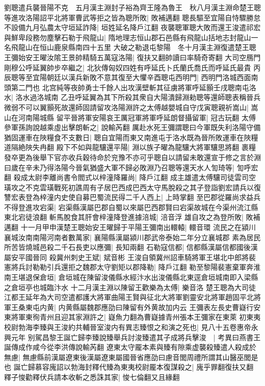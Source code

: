 劉聰遣兵襲晉陽不克　五月漢主淵封子裕為齊王隆為魯王　秋八月漢主淵命楚王聰等進攻洛陽詔平北將軍曹武等拒之皆為聰所敗|{
	敗補邁翻}
聰長驅至宜陽自恃驟勝怠不設備九月弘農太守垣延詐降|{
	垣姓延名降戶江翻}
夜襲聰軍聰大敗而還王浚遣祁宏與鮮卑段務勿塵擊石勒于飛龍山|{
	隋地理志恒山郡石邑縣有飛龍山括地志封龍山一名飛龍山在恒山鹿泉縣南四十五里}
大破之勒退屯黎陽　冬十月漢主淵復遣楚王聰王彌始安王曜汝隂王景帥精騎五萬寇洛陽|{
	復扶又翻帥讀曰率騎奇寄翻}
大司空鴈門剛穆公呼延翼帥步卒繼之|{
	北狄傳匈奴四姓有呼延氏卜氏蘭氏喬氏而呼延氏最貴}
丙辰聰等至宜陽朝廷以漢兵新敗不意其復至大懼辛酉聰屯西明門|{
	西明門洛城西面南頭第二門也}
北宫純等夜帥勇士千餘人出攻漢壁斬其征虜將軍呼延顥壬戌聰南屯洛水|{
	洛水過洛城南}
乙丑呼延翼為其下所殺其衆自大陽潰歸淵勑聰等還師聰表稱晉兵微弱不可以翼顥死故還師固請留攻洛陽淵許之太傅越嬰城自守戊寅聰親祈嵩山|{
	嵩山在河南陽城縣}
留平晉將軍安陽哀王厲冠軍將軍呼延朗督攝留軍|{
	冠古玩翻}
太傅參軍孫詢說越乘虛出擊朗斬之|{
	說輸芮翻}
厲赴水死王彌謂聰曰今軍既失利洛陽守備猶固運車在陜糧食不支數日|{
	聰自宜陽而東又南進屯于洛水既為晉所敗運車在陜糧道隔絶陜失冉翻}
殿下不如與龍驤還平陽|{
	淵以族子曜為龍驤大將軍驤思將翻}
裹糧發卒更為後舉下官亦收兵穀待命於兖豫不亦可乎聰自以請留未敢還宣于修之言於淵曰歲在辛未乃得洛陽今晉氣猶盛大軍不歸必敗淵乃召聰等還天水人訇琦等|{
	訇呼宏翻}
殺成太尉李離尚書令閻式以梓潼降羅尚|{
	降戶江翻}
成主雄遣太傅驤司徒雲司空璜攻之不克雲璜戰死初譙周有子居巴西成巴西太守馬脫殺之其子登詣劉宏請兵以復讐宏表登為梓潼内史使自募巴蜀流民得二千人西上|{
	上時掌翻}
至巴郡從羅尚求益兵不得登進攻宕渠|{
	宕渠縣漢屬巴郡自蜀以來屬巴西郡賢曰宕渠故城在今渠州流江縣東北宕徒浪翻}
斬馬脫食其肝會梓潼降登進據涪城|{
	涪音浮}
雄自攻之為登所敗|{
	敗補邁翻}
十一月甲申漢楚王聰始安王曜歸于平陽王彌南出轘轅|{
	轘音環}
流民之在潁川襄城汝南南陽河南者數萬家|{
	襄陽縣漢屬潁川郡武帝泰始二年分立襄城郡}
素為居民所苦皆燒城邑殺二千石長吏以應彌|{
	長知兩翻}
石勒寇信都|{
	信都縣漢屬信都國後漢屬安平國晉同}
殺冀州刺史王斌|{
	斌音彬}
王浚自領冀州詔車騎將軍王堪北中郎將裴憲將兵討勒勒引兵還拒之魏郡太守劉矩以郡降勒|{
	降戶江翻}
勒至黎陽裴憲棄軍奔淮南王堪退保倉垣|{
	倉垣城在陳留浚儀縣水經汴水出浚儀縣北東逕倉垣城南即入梁縣之倉垣亭也城臨汴水}
十二月漢主淵以陳留王歡樂為太傅|{
	樂音洛}
楚王聰為大司徒江都王延年為大司空遣都護大將軍曲陽王賢與征北大將軍劉靈安北將軍趙固平北將軍王桑東屯内黄|{
	内黄縣屬魏郡應劭曰陳留有外黄故加内云}
王彌表左長史曹嶷行安東將軍東徇青州且迎其家淵許之|{
	嶷魚力翻為曹嶷據青州張本王彌家在東萊}
初東夷校尉勃海李臻與王浚約共輔晉室浚内有異志臻恨之和演之死也|{
	見八十五卷惠帝永興元年}
别駕昌黎王誕亡歸李臻說臻舉兵討浚臻遣其子成將兵擊浚　|{
	考異曰燕書王誕傳成作咸今從李洪傳說輸芮翻}
遼東太守龎本素與臻有隙乘虚襲殺臻遣人殺成於無慮|{
	無慮縣前漢屬遼東後漢屬遼東屬國晉省應劭曰慮音閭周禮所謂其山醫巫閭是也}
誕亡歸慕容廆詔以勃海封釋代臻為東夷校尉龎本復謀殺之|{
	廆乎罪翻復扶又翻}
釋子悛勸釋伏兵請本收斬之悉誅其家|{
	悛七倫翻又且緣翻}


